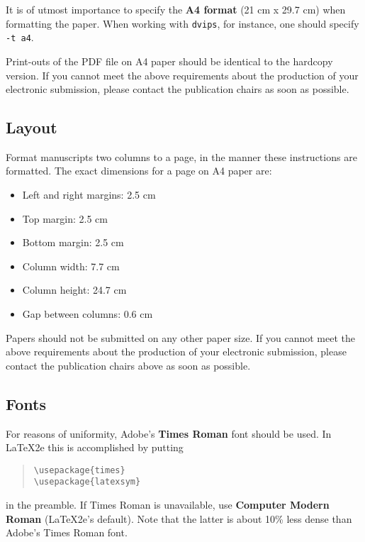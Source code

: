\documentclass[11pt]{article}
\begin{document}
It is of utmost importance to specify the \textbf{A4 format} (21 cm
x 29.7 cm) when formatting the paper. When working with
{\tt dvips}, for instance, one should specify {\tt -t a4}.

Print-outs of the PDF file on A4 paper should be identical to the
hardcopy version. If you cannot meet the above requirements about the
production of your electronic submission, please contact the
publication chairs as soon as possible.


\subsection{Layout}
\label{ssec:layout}

Format manuscripts two columns to a page, in the manner these
instructions are formatted. The exact dimensions for a page on A4
paper are:

\begin{itemize}
\item Left and right margins: 2.5 cm
\item Top margin: 2.5 cm
\item Bottom margin: 2.5 cm
\item Column width: 7.7 cm
\item Column height: 24.7 cm
\item Gap between columns: 0.6 cm
\end{itemize}

\noindent Papers should not be submitted on any other paper size.
 If you cannot meet the above requirements about the production of your electronic submission, please contact the publication chairs above as soon as possible.


\subsection{Fonts}

For reasons of uniformity, Adobe's {\bf Times Roman} font should be
used. In \LaTeX2e{} this is accomplished by putting

\begin{quote}
\begin{verbatim}
\usepackage{times}
\usepackage{latexsym}
\end{verbatim}
\end{quote}
in the preamble. If Times Roman is unavailable, use {\bf Computer
  Modern Roman} (\LaTeX2e{}'s default).  Note that the latter is about
  10\% less dense than Adobe's Times Roman font.
\end{document}
